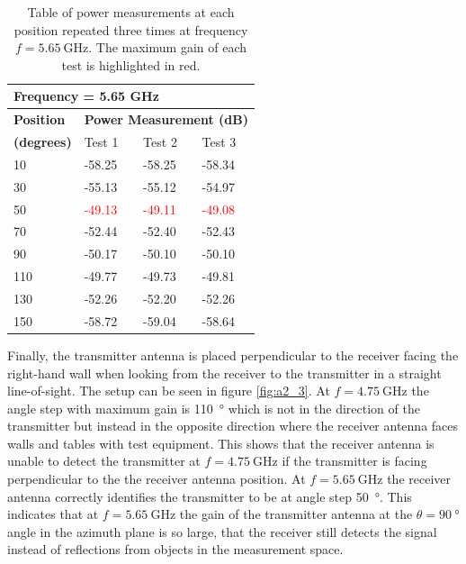 \begin{table}[H]
    \centering
    \begin{tabular}{l|l|l|l}
        \multicolumn{4}{l}{\textbf{Frequency = 5.65 GHz}}         \\
        \hline
        \textbf{Position} & \multicolumn{3}{l}{\textbf{Power Measurement (dB)}} \\
        \textbf{(degrees)}  & Test 1    & Test 2  & Test 3  \\
        \hline
        \hline
        10      & -58.25    & -58.25    & -58.34 \\
        30      & -55.13    & -55.12    & -54.97 \\
        50      & \textcolor{red}{-49.13}    & \textcolor{red}{-49.11}    & \textcolor{red}{-49.08} \\
        70      & -52.44    & -52.40    & -52.43 \\
        90      & -50.17    & -50.10    & -50.10 \\
        110     & -49.77    & -49.73    & -49.81 \\
        130     & -52.26    & -52.20    & -52.26 \\
        150     & -58.72    & -59.04    & -58.64
        \end{tabular}
    \caption{Table of power measurements at each position repeated three times at frequency $f=\SI{5.65}{\giga\hertz}$. The maximum gain of each test is highlighted in red.}
    \label{tab:a2_3b}
\end{table}

Finally, the transmitter antenna is placed perpendicular to the receiver facing the right-hand wall when looking from the receiver to the transmitter in a straight line-of-sight. The setup can be seen in figure \ref{fig:a2_3}. At $f=\SI{4.75}{\giga\hertz}$ the angle step with maximum gain is \SI{110}{\degree} which is not in the direction of the transmitter but instead in the opposite direction where the receiver antenna faces walls and tables with test equipment. This shows that the receiver antenna is unable to detect the transmitter at $f=\SI{4.75}{\giga\hertz}$ if the transmitter is facing perpendicular to the the receiver antenna position. At $f=\SI{5.65}{\giga\hertz}$ the receiver antenna correctly identifies the transmitter to be at angle step \SI{50}{\degree}. This indicates that at $f=\SI{5.65}{\giga\hertz}$ the gain of the transmitter antenna at the $\theta=\SI{90}{\degree}$ angle in the azimuth plane is so large, that the receiver still detects the signal instead of reflections from objects in the measurement space. 


